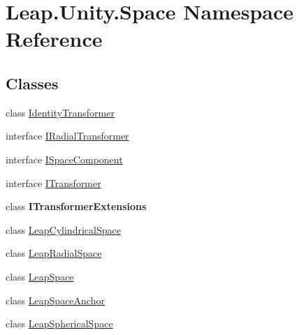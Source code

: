 \hypertarget{namespace_leap_1_1_unity_1_1_space}{}\section{Leap.\+Unity.\+Space Namespace Reference}
\label{namespace_leap_1_1_unity_1_1_space}
\subsection*{Classes}
\begin{DoxyCompactItemize}
\item 
class \mbox{\hyperlink{class_leap_1_1_unity_1_1_space_1_1_identity_transformer}{Identity\+Transformer}}
\item 
interface \mbox{\hyperlink{interface_leap_1_1_unity_1_1_space_1_1_i_radial_transformer}{I\+Radial\+Transformer}}
\item 
interface \mbox{\hyperlink{interface_leap_1_1_unity_1_1_space_1_1_i_space_component}{I\+Space\+Component}}
\item 
interface \mbox{\hyperlink{interface_leap_1_1_unity_1_1_space_1_1_i_transformer}{I\+Transformer}}
\item 
class {\bfseries I\+Transformer\+Extensions}
\item 
class \mbox{\hyperlink{class_leap_1_1_unity_1_1_space_1_1_leap_cylindrical_space}{Leap\+Cylindrical\+Space}}
\item 
class \mbox{\hyperlink{class_leap_1_1_unity_1_1_space_1_1_leap_radial_space}{Leap\+Radial\+Space}}
\item 
class \mbox{\hyperlink{class_leap_1_1_unity_1_1_space_1_1_leap_space}{Leap\+Space}}
\item 
class \mbox{\hyperlink{class_leap_1_1_unity_1_1_space_1_1_leap_space_anchor}{Leap\+Space\+Anchor}}
\item 
class \mbox{\hyperlink{class_leap_1_1_unity_1_1_space_1_1_leap_spherical_space}{Leap\+Spherical\+Space}}
\end{DoxyCompactItemize}
